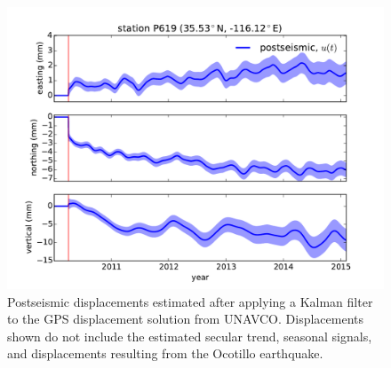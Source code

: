 \documentclass[12pt]{article}
\begin{document}
\begin{figure}

\includegraphics[scale=0.6]{Figures/figure_4}
\centering
\caption{Postseismic displacements estimated after applying a Kalman filter to the GPS displacement solution from UNAVCO.  Displacements shown do not include the estimated secular trend, seasonal signals, and displacements resulting from the Ocotillo earthquake.} 
\label{fig:P619PS}
\end{figure}
\end{document}

